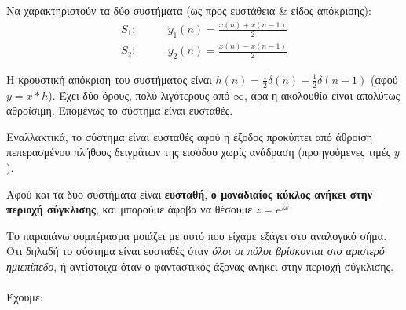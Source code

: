 \documentclass[11pt,a4paper,notitlepage,fleqn]{article}
\begin{document}
\begin{exercise}
\end{exercise}

\begin{exercise}
	Να χαρακτηριστούν τα δύο συστήματα (ως προς ευστάθεια \& είδος απόκρισης):
	\begin{align*}
		S_1: \qquad & y_1(n) = \frac{x(n) + x(n-1)}{2}\\
		S_2: \qquad & y_2(n) = \frac{x(n) - x(n-1)}{2}
	\end{align*}
	
	\tcblower
	
	Η κρουστική απόκριση
	του συστήματος είναι \( h(n) = \frac{1}{2}δ(n) + \frac{1}{2}δ(n-1) \) (αφού \( y=x*h \)). Έχει δύο
	όρους, πολύ λιγότερους από \( \infty \), άρα η ακολουθία είναι απολύτως αθροίσιμη. Επομένως το σύστημα είναι ευσταθές.
	
	Εναλλακτικά, το σύστημα είναι ευσταθές αφού η έξοδος προκύπτει από άθροιση πεπερασμένου πλήθους δειγμάτων της εισόδου χωρίς ανάδραση (προηγούμενες τιμές \( y \)).
	
	Αφού και τα δύο συστήματα είναι \textbf{ευσταθή}, \textbf{ο μοναδιαίος κύκλος ανήκει στην περιοχή σύγκλισης}, και
	μπορούμε άφοβα να θέσουμε \( z=e^{j\omega } \).
	
	Το παραπάνω συμπέρασμα μοιάζει με αυτό που είχαμε εξάγει στο αναλογικό σήμα. Ότι δηλαδή το σύστημα
	είναι ευσταθές όταν \emph{όλοι οι πόλοι βρίσκονται στο αριστερό ημιεπίπεδο}, ή αντίστοιχα όταν ο
	φανταστικός άξονας ανήκει στην περιοχή σύγκλισης.
	
	\paragraph{}
	
	Έχουμε:
	

\end{exercise}
\end{document}
